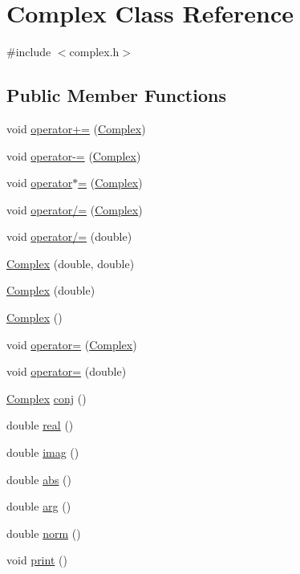 \hypertarget{classComplex}{\section{Complex Class Reference}
\label{classComplex}
}


{\ttfamily \#include $<$complex.\-h$>$}

\subsection*{Public Member Functions}
\begin{DoxyCompactItemize}
\item 
void \hyperlink{classComplex_a8877afd5fbe5266e01afa3f1ee65caf2}{operator+=} (\hyperlink{classComplex}{Complex})
\item 
void \hyperlink{classComplex_ad6208d0d865dac1d404eb89002c1a198}{operator-\/=} (\hyperlink{classComplex}{Complex})
\item 
void \hyperlink{classComplex_a39ff18351bb73b47b97082385471c50f}{operator$\ast$=} (\hyperlink{classComplex}{Complex})
\item 
void \hyperlink{classComplex_a532600202c6224bdbeba8e9a520bcb37}{operator/=} (\hyperlink{classComplex}{Complex})
\item 
void \hyperlink{classComplex_a5f935cdb79789212797ab86995a54354}{operator/=} (double)
\item 
\hyperlink{classComplex_a0a9ac766ecb69aa823210728b5238164}{Complex} (double, double)
\item 
\hyperlink{classComplex_ad79a5d8db5595f6661f066e3a691ac40}{Complex} (double)
\item 
\hyperlink{classComplex_a43b9f07cdf697c71b5fd506a6cc80b8f}{Complex} ()
\item 
void \hyperlink{classComplex_ac1552184a38815b36bf7ab4aa7db5532}{operator=} (\hyperlink{classComplex}{Complex})
\item 
void \hyperlink{classComplex_ae59a38835b27c740513e3bf97a4aff1a}{operator=} (double)
\item 
\hyperlink{classComplex}{Complex} \hyperlink{classComplex_af47321e195aa88899f8c0e3fb83c40d1}{conj} ()
\item 
double \hyperlink{classComplex_aef034069e4bf3741564757568cdec919}{real} ()
\item 
double \hyperlink{classComplex_a9acddda2991090c34a15efd849c1deba}{imag} ()
\item 
double \hyperlink{classComplex_a58d7c29c61d424236f183767ed57b716}{abs} ()
\item 
double \hyperlink{classComplex_a5a7ee1f339769d36e530c1e8311c8551}{arg} ()
\item 
double \hyperlink{classComplex_a7b99e7a4e247a5e871e8614320290d14}{norm} ()
\item 
void \hyperlink{classComplex_abe1c33098179d2cf36f4760a499ac890}{print} ()
\end{DoxyCompactItemize}
